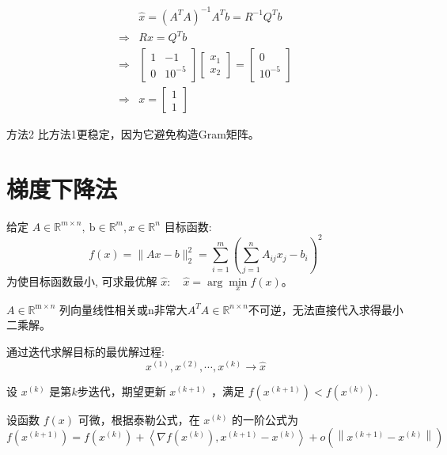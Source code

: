 \begin{example}
$$\begin{aligned}
    &\hat{x}=\left(A^{T} A\right)^{-1} A^{T} b=R^{-1} Q^{T} b \\
    \Rightarrow& R x=Q^{T} b\\
    \Rightarrow& \left[\begin{array}{cc}1 & -1 \\ 0 & 10^{-5}\end{array}\right]\left[\begin{array}{l}x_{1} \\ x_{2}\end{array}\right]=\left[\begin{array}{l}0 \\ 10^{-5}\end{array}\right] \\
    \Rightarrow& x=\left[\begin{array}{l}1 \\ 1\end{array}\right]
\end{aligned}$$

\end{example}

方法2 比方法1更稳定，因为它避免构造Gram矩阵。



\section{梯度下降法}

给定 $ A \in \mathbb{R}^{m \times n}, \mathrm{~b} \in \mathbb{R}^{m}, x \in \mathbb{R}^{n} $ 目标函数:
$$
f(x)=\|A x-b\|_{2}^{2}=\sum_{i=1}^{m}\left(\sum_{j=1}^{n} A_{i j} x_{j}-b_{i}\right)^{2}
$$
为使目标函数最小, 可求最优解 $ \hat{x}: \quad \hat{x}=\arg \underset{x}{ \min } f(x) $。

\begin{problem}
    $ A \in \mathbb{R}^{\mathrm{m} \times n} $ 列向量线性相关或n非常大$
    A^{T} A \in \mathbb{R}^{n \times n}$不可逆，无法直接代入求得最小二乘解。
\end{problem}

通过迭代求解目标的最优解过程: $$ x^{(1)}, x^{(2)}, \cdots, x^{(k)} \rightarrow \hat{x} $$ 

设 $ x^{(k)} $ 是第$k$步迭代，期望更新 $ x^{(k+1)} $ ，满足 $ f\left(x^{(k+1)}\right)<f\left(x^{(k)}\right) $.

设函数 $ f(x) $ 可微，根据泰勒公式，在 $ x^{(k)} $ 的一阶公式为
$$
f\left(x^{(k+1)}\right)=f\left(x^{(k)}\right)+\left\langle\nabla f\left(x^{(k)}\right), x^{(k+1)}-x^{(k)}\right\rangle+o\left(\left\|x^{(k+1)}-x^{(k)}\right\|\right)
$$

